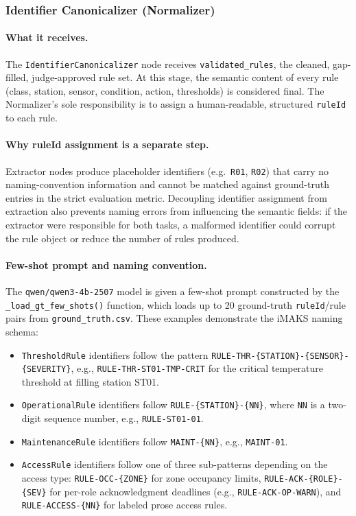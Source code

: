 ﻿\documentclass[11pt]{article}
\begin{document}
\subsubsection{Identifier Canonicalizer (Normalizer)}
\label{sec:normalizer}

\paragraph{What it receives.}
The \texttt{IdentifierCanonicalizer} node receives \texttt{validated\_rules},
the cleaned, gap-filled, judge-approved rule set.  At this stage, the semantic
content of every rule (class, station, sensor, condition, action, thresholds) is
considered final.  The Normalizer's sole responsibility is to assign a
human-readable, structured \texttt{ruleId} to each rule.

\paragraph{Why ruleId assignment is a separate step.}
Extractor nodes produce placeholder identifiers (e.g.\ \texttt{R01}, \texttt{R02})
that carry no naming-convention information and cannot be matched against
ground-truth entries in the strict evaluation metric.  Decoupling identifier
assignment from extraction also prevents naming errors from influencing the
semantic fields: if the extractor were responsible for both tasks, a malformed
identifier could corrupt the rule object or reduce the number of rules produced.

\paragraph{Few-shot prompt and naming convention.}
The \texttt{qwen/qwen3-4b-2507} model is given a few-shot prompt constructed by
the \texttt{\_load\_gt\_few\_shots()} function, which loads up to 20 ground-truth
\texttt{ruleId}/rule pairs from \texttt{ground\_truth.csv}.  These examples
demonstrate the iMAKS naming schema:

\begin{itemize}
    \item \texttt{ThresholdRule} identifiers follow the pattern
          \texttt{RULE-THR-\{STATION\}-\{SENSOR\}-\{SEVERITY\}}, e.g.,
          \texttt{RULE-THR-ST01-TMP-CRIT} for the critical temperature threshold
          at filling station ST01.
    \item \texttt{OperationalRule} identifiers follow
          \texttt{RULE-\{STATION\}-\{NN\}}, where \texttt{NN} is a two-digit
          sequence number, e.g., \texttt{RULE-ST01-01}.
    \item \texttt{MaintenanceRule} identifiers follow
          \texttt{MAINT-\{NN\}}, e.g., \texttt{MAINT-01}.
    \item \texttt{AccessRule} identifiers follow one of three sub-patterns
          depending on the access type: \texttt{RULE-OCC-\{ZONE\}} for zone
          occupancy limits, \texttt{RULE-ACK-\{ROLE\}-\{SEV\}} for per-role
          acknowledgment deadlines (e.g., \texttt{RULE-ACK-OP-WARN}), and
          \texttt{RULE-ACCESS-\{NN\}} for labeled prose access rules.
\end{itemize}
\end{document}
